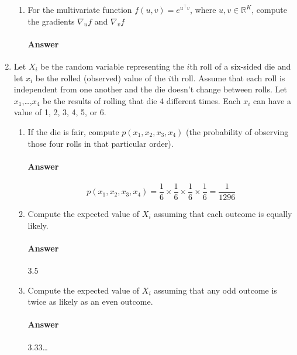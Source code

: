\documentclass[12pt]{article}
\begin{document}
\begin{enumerate}
\begin{enumerate}
  \item For the multivariate function $f(u,v) = e^{u^{\top}v}$, where $u, v \in \mathbb{R}^K$,
        compute the gradients $\nabla_u f$ and $\nabla_v f$ \\
  \vspace{-2.5em}
  \paragraph{Answer}
  \end{enumerate}

\item Let $X_i$ be the random variable representing the $i$th roll of a six-sided die
      and let $x_i$ be the rolled (observed) value of the $i$th roll. Assume that each
      roll is independent from one another and the die doesn't change between rolls.
      Let $x_1$,\dots,$x_4$ be the results of rolling that die 4 different times. Each 
      $x_i$ can have a value of 1, 2, 3, 4, 5, or 6.
  \begin{enumerate}
  \item If the die is fair, compute $p(x_1, x_2, x_3, x_4)$ (the probability of observing
        those four rolls in that particular order).\\
  \vspace{-2.5em}
  \paragraph{Answer} $$p(x_1, x_2, x_3, x_4) = \frac{1}{6} \times \frac{1}{6} \times \frac{1}{6} \times \frac{1}{6} = \frac{1}{1296}$$

  \item Compute the expected value of $X_i$ assuming that each outcome is equally likely.\\
  \vspace{-2.5em}
  \paragraph{Answer} 3.5

  \item Compute the expected value of $X_i$ assuming that any odd outcome is twice as likely as an even outcome.\\
  \vspace{-2.5em}
  \paragraph{Answer} 3.33\dots
  \end{enumerate}


\end{enumerate}
\end{document}
